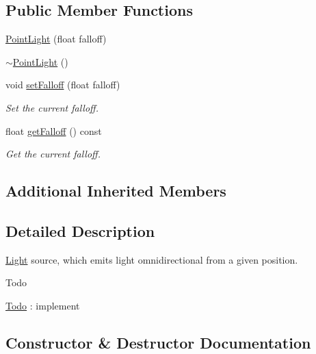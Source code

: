 \subsection*{Public Member Functions}
\begin{DoxyCompactItemize}
\item 
\mbox{\hyperlink{classec_1_1_point_light_a0c923024a80bc54416d7b4fe30831546}{Point\+Light}} (float falloff)
\item 
\mbox{\hyperlink{classec_1_1_point_light_aef9daa8a54baa73d1dfc724100cfbf38}{$\sim$\+Point\+Light}} ()
\item 
void \mbox{\hyperlink{classec_1_1_point_light_a64949f08f93b178b110f9c366d72ce89}{set\+Falloff}} (float falloff)
\begin{DoxyCompactList}\small\item\em Set the current falloff. \end{DoxyCompactList}\item 
float \mbox{\hyperlink{classec_1_1_point_light_a916752aad9fa46fc86c8df3fe1f796cb}{get\+Falloff}} () const
\begin{DoxyCompactList}\small\item\em Get the current falloff. \end{DoxyCompactList}\end{DoxyCompactItemize}
\subsection*{Additional Inherited Members}


\subsection{Detailed Description}
\mbox{\hyperlink{classec_1_1_light}{Light}} source, which emits light omnidirectional from a given position. 

\begin{DoxyRefDesc}{Todo}
\item[\mbox{\hyperlink{todo__todo000004}{Todo}}]\+: implement \end{DoxyRefDesc}


\subsection{Constructor \& Destructor Documentation}
\mbox{\label{classec_1_1_point_light_a0c923024a80bc54416d7b4fe30831546}} 
